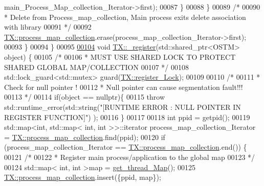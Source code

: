 \begin{DoxyCode}
      main\_Process\_Map\_collection\_Iterator->first);      
00087             \}
00088         \}
00089         \textcolor{comment}{/*}
00090 \textcolor{comment}{         * Delete from Process\_map\_collection, Main process exits delete association with library}
00091 \textcolor{comment}{         */}
00092         \hyperlink{class_t_x_aea5b8eedcd5059384155576b3979a5f6_aea5b8eedcd5059384155576b3979a5f6}{TX::process\_map\_collection}.erase(process\_map\_collection\_Iterator->first);
00093     \}
00094 \}
00095 
\hypertarget{_t_x_8cpp_source.tex_l00104}{}\hyperlink{class_t_x_abc32af2f51df97ac483e5bfe7db6ca6e_abc32af2f51df97ac483e5bfe7db6ca6e}{00104} \textcolor{keywordtype}{void} \hyperlink{class_t_x_abc32af2f51df97ac483e5bfe7db6ca6e_abc32af2f51df97ac483e5bfe7db6ca6e}{TX::\_register}(std::shared\_ptr<OSTM> \textcolor{keywordtype}{object}) \{
00105     \textcolor{comment}{/*}
00106 \textcolor{comment}{     * MUST USE SHARED LOCK TO PROTECT SHARED GLOBAL MAP/COLLECTION }
00107 \textcolor{comment}{     */}
00108     std::lock\_guard<std::mutex> guard(\hyperlink{class_t_x_aa688a8c96fa3cdf8cd92e267463536dc_aa688a8c96fa3cdf8cd92e267463536dc}{TX::register\_Lock});
00109     
00110     \textcolor{comment}{/*}
00111 \textcolor{comment}{     * Check for null pointer !}
00112 \textcolor{comment}{     * Null pointer can cause segmentation fault!!!}
00113 \textcolor{comment}{     */}
00114     \textcolor{keywordflow}{if}(\textcolor{keywordtype}{object} == \textcolor{keyword}{nullptr})\{
00115         \textcolor{keywordflow}{throw} std::runtime\_error(std::string(\textcolor{stringliteral}{"[RUNTIME ERROR : NULL POINTER IN REGISTER FUNCTION]"}) );
00116     \}
00117     
00118     \textcolor{keywordtype}{int} ppid = getpid();
00119     std::map<int, std::map< int, int >>::iterator process\_map\_collection\_Iterator = 
      \hyperlink{class_t_x_aea5b8eedcd5059384155576b3979a5f6_aea5b8eedcd5059384155576b3979a5f6}{TX::process\_map\_collection}.find(ppid);
00120     \textcolor{keywordflow}{if} (process\_map\_collection\_Iterator == \hyperlink{class_t_x_aea5b8eedcd5059384155576b3979a5f6_aea5b8eedcd5059384155576b3979a5f6}{TX::process\_map\_collection}.end()) \{
00121         \textcolor{comment}{/*}
00122 \textcolor{comment}{         * Register main process/application to the global map}
00123 \textcolor{comment}{         */}
00124         std::map< int, int >map =  \hyperlink{class_t_x_a3f5671423cb7b9f9c98f8a25f2a4b545_a3f5671423cb7b9f9c98f8a25f2a4b545}{get\_thread\_Map}();
00125         \hyperlink{class_t_x_aea5b8eedcd5059384155576b3979a5f6_aea5b8eedcd5059384155576b3979a5f6}{TX::process\_map\_collection}.insert(\{ppid, map\});

\end{DoxyCode}

